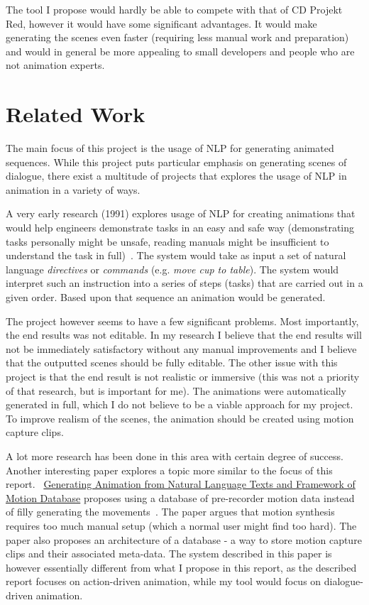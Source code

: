 The tool I propose would hardly be able to compete with that of CD Projekt Red, however it would have some significant advantages. It would make generating the scenes even faster (requiring less manual work and preparation) and would in general be more appealing to small developers and people who are not animation experts.

\section{Related Work}
The main focus of this project is the usage of NLP for generating animated sequences. While this project puts particular emphasis on generating scenes of dialogue, there exist a multitude of projects that explores the usage of NLP in animation in a variety of ways.

A very early research (1991) explores usage of NLP for creating animations that would help engineers demonstrate tasks in an easy and safe way (demonstrating tasks personally might be unsafe, reading manuals might be insufficient to understand the task in full)~\cite{animosha}. The system would take as input a set of natural language \textit{directives} or \textit{commands} (e.g. \textit{move cup to table}). The system would interpret such an instruction into a series of steps (tasks) that are carried out in a given order. Based upon that sequence an animation would be generated.

The project however seems to have a few significant problems. Most importantly, the end results was not editable. In my research I believe that the end results will not be immediately satisfactory without any manual improvements and I believe that the outputted scenes should be fully editable. The other issue with this project is that the end result is not realistic or immersive (this was not a priority of that research, but is important for me). The animations were automatically generated in full, which I do not believe to be a viable approach for my project. To improve realism of the scenes, the animation should be created using motion capture clips.

A lot more research has been done in this area with certain degree of success. Another interesting paper explores a topic more similar to the focus of this report. ~\url{Generating Animation from Natural Language Texts and Framework of Motion Database} proposes using a database of pre-recorder motion data instead of filly generating the movements~\cite{animmc}. The paper argues that motion synthesis requires too much manual setup (which a normal user might find too hard). The paper also proposes an architecture of a database -  a way to store motion capture clips and their associated meta-data. The system described in this paper is however essentially different from what I propose in this report, as the described report focuses on action-driven animation, while my tool would focus on dialogue-driven animation.


